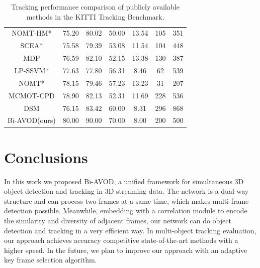 \documentclass{bmvc2k}
\begin{document}
\begin{table}[]
\begin{tabular}{ccccccc}
		NOMT-HM*      & 75.20    & 80.02    & 50.00  & 13.54  & 105 & 351  \\
		SCEA*         & 75.58    & 79.39    & 53.08  & 11.54  & 104 & 448  \\
		MDP           & 76.59    & 82.10    & 52.15  & 13.38  & 130 & 387  \\
		LP-SSVM*      & 77.63    & 77.80    & 56.31  & 8.46   & 62  & 539  \\
		NOMT*         & 78.15    & 79.46    & 57.23  & 13.23  & 31  & 207  \\
		MCMOT-CPD     & 78.90    & 82.13    & 52.31  & 11.69  & 228 & 536  \\
		DSM           & 76.15    & 83.42    & 60.00  & 8.31   & 296 & 868  \\ \midrule
		Bi-AVOD(ours) & 80.00    & 90.00    & 70.00  & 8.00   & 200 & 500  \\ 
		\bottomrule[1.5pt]
	\end{tabular}
	\setlength{\abovecaptionskip}{1pt}
	\caption{Tracking performance comparison of publicly available methods in the KITTI Tracking Benchmark.}
	\label{label:result_tracking}
\end{table}


\section{Conclusions}
\label{sec:conclusions} In this work we proposed Bi-AVOD, a unified framework for simultaneous 3D object detection and tracking in 3D streaming data. The network is a dual-way structure and can  process two frames at a same time, which makes multi-frame detection possible. Meanwhile, embedding with a correlation module to encode the similarity and diversity of adjacent frames, our network can do object detection and tracking in a very efficient way. In multi-object tracking evaluation, our approach achieves accuracy competitive state-of-the-art methods with a higher speed. In the future, we plan to improve our approach with an adaptive key frame selection algorithm.


\end{document}
